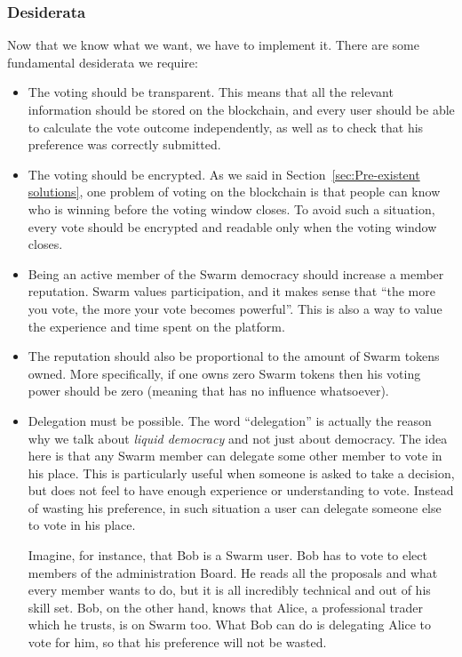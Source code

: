 \documentclass[submission, copyright,creativecommons,sharealike,noncommercial]{eptcs}
\begin{document}
\subsubsection{Desiderata}\label{subsubsec:Desiderata}
	Now that we know what we want, we have to implement it. There are some fundamental desiderata we require:
	\begin{itemize}
		\item The voting should be transparent. This means that all the relevant information should be stored on the blockchain, and every user should be able to calculate the vote outcome independently, as well as to check that his preference was correctly submitted.
		\item The voting should be encrypted. As we said in Section~\ref{sec:Pre-existent solutions}, one problem of voting on the blockchain is that people can know who is winning before the voting window closes. To avoid such a situation, every vote should be encrypted and readable only when the voting window closes.
		\item Being an active member of the Swarm democracy should increase a member reputation. Swarm values participation, and it makes sense that ``the more you vote, the more your vote becomes powerful''. This is also a way to value the experience and time spent on the platform.
		\item The reputation should also be proportional to the amount of Swarm tokens owned. More specifically, if one owns zero Swarm tokens then his voting power should be zero (meaning that has no influence whatsoever).
		\item Delegation must be possible. The word ``delegation'' is actually the reason why we talk about \emph{liquid democracy} and not just about democracy. The idea here is that any Swarm member can delegate some other member to vote in his place. This is particularly useful when someone is asked to take a decision, but does not feel to have enough experience or understanding to vote. Instead of wasting his preference, in such situation a user can delegate someone else to vote in his place.
		
		Imagine, for instance, that Bob is a Swarm user. Bob has to vote to elect members of the administration Board. He reads all the proposals and what every member wants to do, but it is all incredibly technical and out of his skill set. Bob, on the other hand, knows that Alice, a professional trader which he trusts, is on Swarm too. What Bob can do is delegating Alice to vote for him, so that his preference will not be wasted.		
	\end{itemize}
%
%
\end{document}
